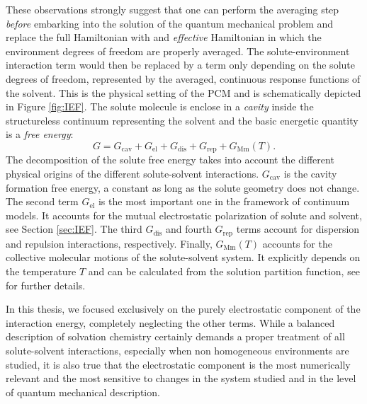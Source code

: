 These observations strongly suggest that one can perform the averaging
step \emph{before} embarking into the solution of the quantum mechanical
problem and replace the full Hamiltonian with and \emph{effective}
Hamiltonian in which the environment degrees of freedom are properly
averaged.\autocite{Angyan1992-vo, Tapia1992-pu}
The solute-environment interaction term would then be replaced by
a term only depending on the solute degrees of freedom, represented by
the averaged, continuous response functions of the solvent.
This is the physical setting of the \gls{PCM} and is schematically
depicted in Figure \ref{fig:IEF}.
The solute molecule is enclose in a \emph{cavity} inside the
structureless continuum representing the solvent and the basic energetic
quantity is a \emph{free energy}:\autocite{Tomasi1994-gv,
Amovilli1998-pv, Tomasi2005-vm}
\begin{equation}\label{eq:free-energy}
 G = G_\mathrm{cav} + G_\mathrm{el} + G_\mathrm{dis} + G_\mathrm{rep} + G_\mathrm{Mm}(T).
\end{equation}
The decomposition of the solute free energy takes into account the
different physical origins of the different solute-solvent interactions.
$G_\mathrm{cav}$ is the cavity formation free energy, a constant as long
as the solute geometry does not change.\autocite{Tomasi1994-gv,
Floris1997-tu}
The second term $G_\mathrm{el}$ is the most important one in the
framework of continuum models. It accounts for the mutual electrostatic
polarization of solute and solvent, see Section \ref{sec:IEF}.
The third $G_\mathrm{dis}$ and fourth $G_\mathrm{rep}$ terms account for
dispersion and repulsion interactions,
respectively.\autocite{Amovilli1997-fo, Weijo2010-jy}
Finally, $G_\mathrm{Mm}(T)$ accounts for the collective molecular
motions of the solute-solvent system. It explicitly depends on the
temperature $T$ and can be calculated from the solution partition
function, see  for further details.

In this thesis, we focused exclusively on the purely electrostatic
component of the interaction energy, completely neglecting the other
terms.
While a balanced description of solvation chemistry certainly demands
a proper treatment of all solute-solvent interactions, especially when
non homogeneous environments are studied,\autocite{Mozgawa2014-ad,
Mozgawa2016-wf} it is also true that the electrostatic component is the
most numerically relevant and the most sensitive to changes in the
system studied and in the level of quantum mechanical description.

